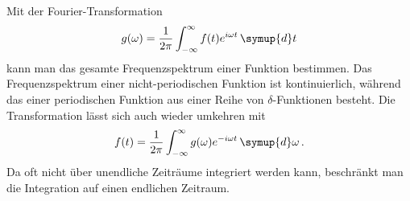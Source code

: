Mit der Fourier-Transformation
\begin{equation}
    g(\omega) = \frac{1}{2\pi} \int_{-\infty}^{\infty} f(t) e^{i\omega t} \, \symup{d}t
\end{equation}
kann man das gesamte Frequenzspektrum einer Funktion bestimmen.
Das Frequenzspektrum einer nicht-periodischen Funktion ist kontinuierlich, während das einer periodischen Funktion aus einer Reihe von $\delta$-Funktionen besteht.
Die Transformation lässt sich auch wieder umkehren mit
\begin{equation}
    f(t) = \frac{1}{2\pi} \int_{-\infty}^{\infty} g(\omega) e^{-i\omega t} \, \symup{d}\omega \, .
\end{equation}
Da oft nicht über unendliche Zeiträume integriert werden kann, beschränkt man die Integration auf einen endlichen Zeitraum.